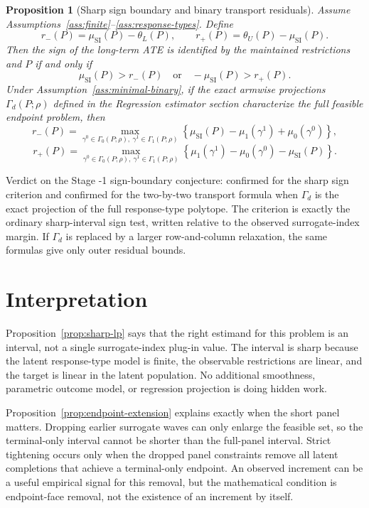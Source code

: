 \documentclass[11pt]{article}
\theoremstyle{definition}
\theoremstyle{plain}
\newtheorem{proposition}{Proposition}
\theoremstyle{remark}
\begin{document}
\begin{proposition}[Sharp sign boundary and binary transport residuals]\label{prop:sign-boundary}
Assume Assumptions~\ref{ass:finite}--\ref{ass:response-types}.  Define
\[
  r_-(P)=\mu_{\mathrm{SI}}(P)-\theta_L(P),
  \qquad
  r_+(P)=\theta_U(P)-\mu_{\mathrm{SI}}(P).
\]
Then the sign of the long-term ATE is identified by the maintained restrictions and \(P\) if and only if
\[
  \mu_{\mathrm{SI}}(P)>r_-(P)
  \quad\text{or}\quad
  -\mu_{\mathrm{SI}}(P)>r_+(P).
\]
Under Assumption~\ref{ass:minimal-binary}, if the exact armwise projections \(\Gamma_d(P;\rho)\) defined in the Regression estimator section characterize the full feasible endpoint problem, then
\[
  r_-(P)=
  \max_{\gamma^0\in\Gamma_0(P;\rho),\ \gamma^1\in\Gamma_1(P;\rho)}
  \left\{
    \mu_{\mathrm{SI}}(P)-\mu_1(\gamma^1)+\mu_0(\gamma^0)
  \right\},
\]
\[
  r_+(P)=
  \max_{\gamma^0\in\Gamma_0(P;\rho),\ \gamma^1\in\Gamma_1(P;\rho)}
  \left\{
    \mu_1(\gamma^1)-\mu_0(\gamma^0)-\mu_{\mathrm{SI}}(P)
  \right\}.
\]
\end{proposition}

Verdict on the Stage -1 sign-boundary conjecture: confirmed for the sharp sign criterion and confirmed for the two-by-two transport formula when \(\Gamma_d\) is the exact projection of the full response-type polytope.  The criterion is exactly the ordinary sharp-interval sign test, written relative to the observed surrogate-index margin.  If \(\Gamma_d\) is replaced by a larger row-and-column relaxation, the same formulas give only outer residual bounds.

\section{Interpretation}
Proposition~\ref{prop:sharp-lp} says that the right estimand for this problem is an interval, not a single surrogate-index plug-in value.  The interval is sharp because the latent response-type model is finite, the observable restrictions are linear, and the target is linear in the latent population.  No additional smoothness, parametric outcome model, or regression projection is doing hidden work.

Proposition~\ref{prop:endpoint-extension} explains exactly when the short panel matters.  Dropping earlier surrogate waves can only enlarge the feasible set, so the terminal-only interval cannot be shorter than the full-panel interval.  Strict tightening occurs only when the dropped panel constraints remove all latent completions that achieve a terminal-only endpoint.  An observed increment can be a useful empirical signal for this removal, but the mathematical condition is endpoint-face removal, not the existence of an increment by itself.
\end{document}
